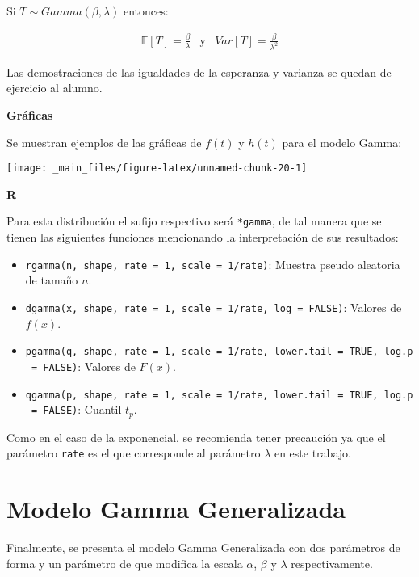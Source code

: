 \documentclass[
  a4paper,
  oneside,
  openany]{book}
\providecommand{\tightlist}{%
  \setlength{\itemsep}{0pt}\setlength{\parskip}{0pt}}
\begin{document}
Si \(T\sim Gamma(\beta,\lambda)\) entonces:

\[
\begin{array}{ccc}
\mathbb{E}[T]=\frac{\beta}{\lambda} & \mbox{y} &
Var[T]=\frac{\beta}{\lambda^2}
\end{array}
\]

Las demostraciones de las igualdades de la esperanza y varianza se quedan de ejercicio al alumno.

\textbf{Gráficas}

Se muestran ejemplos de las gráficas de \(f(t)\) y \(h(t)\) para el modelo Gamma:

\begin{center}\texttt{[image: \_main\_files/figure-latex/unnamed-chunk-20-1]} \end{center}

\textbf{R}

Para esta distribución el sufijo respectivo será \texttt{*gamma}, de tal manera que se tienen las siguientes funciones mencionando la interpretación de sus resultados:

\begin{itemize}
\tightlist
\item
  \texttt{rgamma(n,\ shape,\ rate\ =\ 1,\ scale\ =\ 1/rate)}: Muestra pseudo aleatoria de tamaño \(n\).
\item
  \texttt{dgamma(x,\ shape,\ rate\ =\ 1,\ scale\ =\ 1/rate,\ log\ =\ FALSE)}: Valores de \(f(x)\).
\item
  \texttt{pgamma(q,\ shape,\ rate\ =\ 1,\ scale\ =\ 1/rate,\ lower.tail\ =\ TRUE,\ log.p\ =\ FALSE)}: Valores de \(F(x)\).
\item
  \texttt{qgamma(p,\ shape,\ rate\ =\ 1,\ scale\ =\ 1/rate,\ lower.tail\ =\ TRUE,\ log.p\ =\ FALSE)}: Cuantil \(t_p\).
\end{itemize}

Como en el caso de la exponencial, se recomienda tener precaución ya que el parámetro \texttt{rate} es el que corresponde al parámetro \(\lambda\) en este trabajo.

\hypertarget{modelo-gamma-generalizada}{%
\section{Modelo Gamma Generalizada}\label{modelo-gamma-generalizada}}

Finalmente, se presenta el modelo Gamma Generalizada con dos parámetros de forma y un parámetro de que modifica la escala \(\alpha\), \(\beta\) y \(\lambda\) respectivamente.
\end{document}
